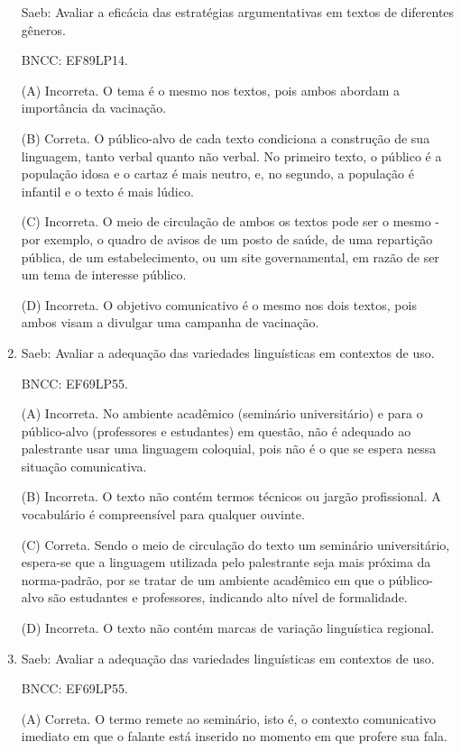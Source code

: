 \begin{enumerate}
Saeb: Avaliar a eficácia das estratégias argumentativas em textos de
diferentes gêneros.

BNCC: EF89LP14.

(A) Incorreta. O tema é o mesmo nos textos, pois ambos abordam a importância da vacinação.

(B) Correta. O público-alvo de cada texto condiciona a construção de sua
linguagem, tanto verbal quanto não verbal. No primeiro texto, o público é a população idosa e o cartaz é mais neutro, e, no segundo, a população é
infantil e o texto é mais lúdico.

(C) Incorreta. O meio de circulação de ambos os textos pode ser o mesmo - 
por exemplo, o quadro de avisos de um posto de saúde, de uma repartição
pública, de um estabelecimento, ou um site governamental, em razão de
ser um tema de interesse público.

(D) Incorreta. O objetivo comunicativo é o mesmo nos dois textos, pois
ambos visam a divulgar uma campanha de vacinação.

\item

Saeb: Avaliar a adequação das variedades linguísticas em contextos de
uso.

BNCC: EF69LP55.

(A) Incorreta. No ambiente acadêmico (seminário universitário) e para o
público-alvo (professores e estudantes) em questão, não é adequado ao
palestrante usar uma linguagem coloquial, pois não é o que se espera
nessa situação comunicativa.

(B) Incorreta. O texto não contém termos técnicos ou jargão
profissional. A vocabulário é compreensível para qualquer ouvinte.

(C) Correta. Sendo o meio de circulação do texto um seminário
universitário, espera-se que a linguagem utilizada pelo palestrante seja
mais próxima da norma-padrão, por se tratar de um ambiente acadêmico em
que o público-alvo são estudantes e professores, indicando alto nível de
formalidade.

(D) Incorreta. O texto não contém marcas de variação linguística
regional.

\item

Saeb: Avaliar a adequação das variedades linguísticas em contextos de
uso.

BNCC: EF69LP55.

(A) Correta. O termo remete ao seminário, isto é, o contexto
comunicativo imediato em que o falante está inserido no momento em que
profere sua fala.


\end{enumerate}
